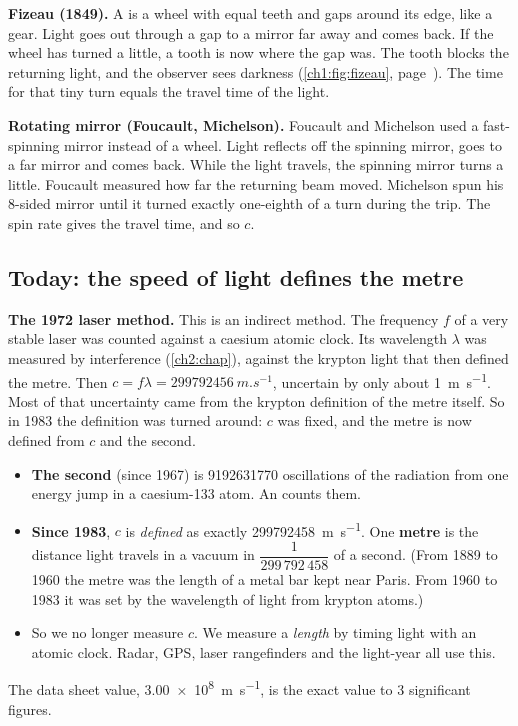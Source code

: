 \textbf{Fizeau (1849).} A  is a wheel with equal teeth and gaps around its
edge, like a gear. Light goes out through a gap to a mirror far away and comes back. If the
wheel has turned a little, a tooth is now where the gap was. The tooth blocks the returning
light, and the observer sees darkness (\cref{ch1:fig:fizeau}, page~\pageref{ch1:fig:fizeau}). The
time for that tiny turn equals the travel time of the light.

\textbf{Rotating mirror (Foucault, Michelson).} Foucault and Michelson used a fast-spinning
mirror instead of a wheel. Light reflects off the spinning mirror, goes to a far mirror and
comes back. While the light travels, the spinning mirror turns a little. Foucault measured how
far the returning beam moved. Michelson spun his 8-sided mirror until it turned exactly
one-eighth of a turn during the trip. The spin rate gives the travel time, and so $c$.


\subsection{Today: the speed of light defines the metre}

\textbf{The 1972 laser method.} This is an indirect method. The frequency $f$ of a very stable
laser was counted against a caesium atomic clock. Its wavelength $\lambda$ was measured by
interference (\cref{ch2:chap}), against the krypton light that then defined the metre. Then
$c = f\lambda = \qty{299792456}{m.s^{-1}}$, uncertain by only about \qty{1}{m.s^{-1}}. Most of
that uncertainty came from the krypton definition of the metre itself. So in 1983 the definition
was turned around: $c$ was fixed, and the metre is now defined from $c$ and the second.

\begin{itemize}
  \item \textbf{The second} (since 1967) is \num{9192631770} oscillations of the radiation from
        one energy jump in a caesium-133 atom. An  counts them.
  \item \textbf{Since 1983}, $c$ is \emph{defined} as exactly \qty{299792458}{m.s^{-1}}. One
        \textbf{metre} is the distance light travels in a vacuum in $\dfrac{1}{299\,792\,458}$
        of a second. (From 1889 to 1960 the metre was the length of a metal bar kept near
        Paris. From 1960 to 1983 it was set by the wavelength of light from krypton atoms.)
  \item So we no longer measure $c$. We measure a \emph{length} by timing light with an atomic
        clock. Radar, GPS, laser rangefinders and the light-year all use this.
\end{itemize}
The data sheet value, \qty{3.00e8}{m.s^{-1}}, is the exact value to 3 significant figures.

